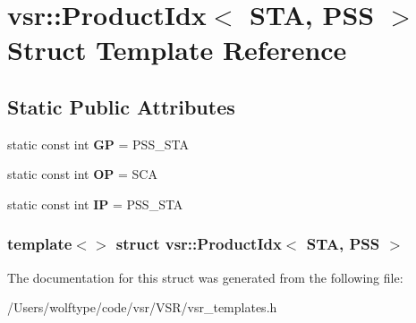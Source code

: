 \hypertarget{structvsr_1_1_product_idx_3_01_s_t_a_00_01_p_s_s_01_4}{\section{vsr\-:\-:Product\-Idx$<$ S\-T\-A, P\-S\-S $>$ Struct Template Reference}
\label{structvsr_1_1_product_idx_3_01_s_t_a_00_01_p_s_s_01_4}
}
\subsection*{Static Public Attributes}
\begin{DoxyCompactItemize}
\item 
\hypertarget{structvsr_1_1_product_idx_3_01_s_t_a_00_01_p_s_s_01_4_a6a90280641dd75e1a3eeb59ce38d29e4}{static const int {\bfseries G\-P} = P\-S\-S\-\_\-\-S\-T\-A}\label{structvsr_1_1_product_idx_3_01_s_t_a_00_01_p_s_s_01_4_a6a90280641dd75e1a3eeb59ce38d29e4}

\item 
\hypertarget{structvsr_1_1_product_idx_3_01_s_t_a_00_01_p_s_s_01_4_a11266b44af46126e8f96c7d7827c0ee1}{static const int {\bfseries O\-P} = S\-C\-A}\label{structvsr_1_1_product_idx_3_01_s_t_a_00_01_p_s_s_01_4_a11266b44af46126e8f96c7d7827c0ee1}

\item 
\hypertarget{structvsr_1_1_product_idx_3_01_s_t_a_00_01_p_s_s_01_4_a0fee28b7fa31ad428ea0c182c985598c}{static const int {\bfseries I\-P} = P\-S\-S\-\_\-\-S\-T\-A}\label{structvsr_1_1_product_idx_3_01_s_t_a_00_01_p_s_s_01_4_a0fee28b7fa31ad428ea0c182c985598c}

\end{DoxyCompactItemize}
\subsubsection*{template$<$$>$ struct vsr\-::\-Product\-Idx$<$ S\-T\-A, P\-S\-S $>$}



The documentation for this struct was generated from the following file\-:\begin{DoxyCompactItemize}
\item 
/\-Users/wolftype/code/vsr/\-V\-S\-R/vsr\-\_\-templates.\-h\end{DoxyCompactItemize}
